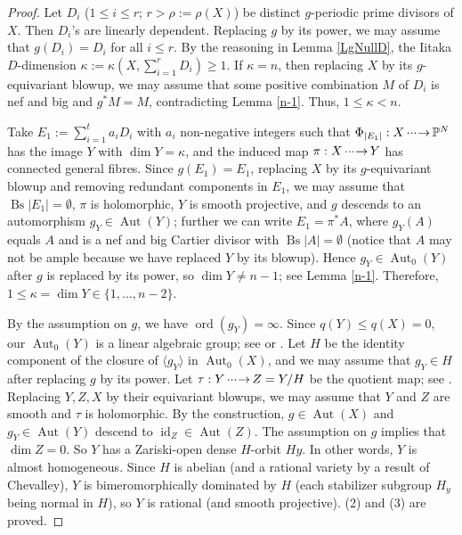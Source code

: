 \documentclass[11pt,a4paper,psamsfonts]{amsart}
\theoremstyle{plain}
\theoremstyle{definition}
\theoremstyle{remark}
\begin{document}
\begin{proof}
Let $D_i$ ($1 \le i \le r; \, r > \rho := \rho(X)$)
be distinct $g$-periodic prime divisors of $X$.
Then $D_i$'s are linearly dependent.
Replacing $g$ by its power, we may assume that $g(D_i) = D_i$ for all $i \le r$.
By the reasoning in Lemma \ref{LgNullD}, the Iitaka $D$-dimension
$\kappa := \kappa(X, \sum_{i = 1}^r D_{i}) \ge 1$.
If $\kappa = n$, then replacing $X$ by its $g$-equivariant blowup,
we may assume that some positive combination $M$ of $D_i$ is nef and big
and $g^*M = M$, contradicting Lemma \ref{n-1}.
Thus, $1 \le \kappa < n$.

Take $E_1 := \sum_{i=1}^t a_i D_i$ with $a_i$ non-negative integers
such that $\Phi_{|E_1|} : X {{\,\cdot\negmedspace\cdot\negmedspace\cdot\negmedspace\to\,}} {\mathbb{P}}^N$ has the image $Y$ with
$\dim Y = \kappa$, and the induced map $\pi : X {{\,\cdot\negmedspace\cdot\negmedspace\cdot\negmedspace\to\,}} Y$ has connected general fibres.
Since $g(E_1) = E_1$,
replacing $X$ by its $g$-equivariant blowup
and removing redundant components in $E_1$,
we may assume that ${\operatorname{Bs}}|E_1| = \emptyset$, $\pi$ is holomorphic, $Y$ is smooth projective,
and $g$ descends to an automorphism $g_Y \in {\operatorname{Aut}}(Y)$;
further we can write $E_1 = \pi^*A$, where $g_Y(A)$ equals $A$ and is a nef and
big Cartier divisor with ${\operatorname{Bs}}|A| = \emptyset$
(notice that $A$ may not be ample because we have replaced $Y$ by its blowup).
Hence
$g_Y \in {\operatorname{Aut}}_0(Y)$ after $g$ is replaced by its power, so
$\dim Y \ne n-1$; see Lemma \ref{n-1}.
Therefore, $1 \le \kappa = \dim Y \in \{1, \dots, n-2\}$.

By the assumption on $g$, we have ${\operatorname{ord}}(g_Y) = \infty$.
Since $q(Y) \le q(X) = 0$, our ${\operatorname{Aut}}_0(Y)$ is a linear algebraic group;
see \cite[Theorem 3.12]{Li} or \cite[Corollary 5.8]{Fu}.
Let $H$ be the identity component of the closure of $\langle g_Y \rangle$ in ${\operatorname{Aut}}_0(X)$,
and we may assume that $g_Y \in H$ after replacing $g$ by its power.
Let $\tau: Y {{\,\cdot\negmedspace\cdot\negmedspace\cdot\negmedspace\to\,}} Z = Y/H$ be the quotient map; see \cite[Theorem 4.1]{Fu}.
Replacing $Y, Z, X$ by their equivariant blowups, we may assume that
$Y$ and $Z$ are smooth and $\tau$ is holomorphic.
By the construction,
$g \in {\operatorname{Aut}}(X)$ and $g_Y \in {\operatorname{Aut}}(Y)$ descend to ${\operatorname{id}}_Z \in {\operatorname{Aut}}(Z)$.
The assumption on $g$ implies that $\dim Z = 0$. So $Y$ has
a Zariski-open dense $H$-orbit $Hy$. In other words, $Y$ is almost homogeneous.
Since $H$ is abelian (and a rational variety by a result of Chevalley),
$Y$ is bimeromorphically dominated by $H$
(each stabilizer subgroup $H_y$ being normal in $H$),
so $Y$ is rational (and smooth projective).
(2) and (3) are proved.


\end{proof}
\end{document}
